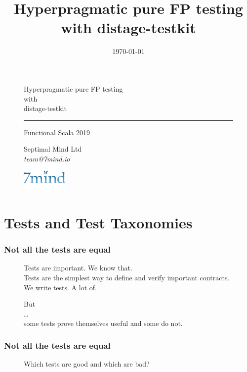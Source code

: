 \documentclass[usenames,dvipsnames]{beamer}
\title{Hyperpragmatic pure FP testing with distage-testkit}
\institute[Septimal Mind Ltd]
    {
    Septimal Mind Ltd\\
    \medskip
    \textit{team@7mind.io}
    }
\date{\today}
\begin{document}
\begin{frame}

\begin{figure}
\color{RubineRed}
\Huge Hyperpragmatic pure FP testing \\
with \\
distage-testkit

\rule{\linewidth}{1mm}

\normalsize Functional Scala 2019
\end{figure}

\begin{figure}
  Septimal Mind Ltd \\
  \textit{team@7mind.io} \\
  \includegraphics[width=0.2\textwidth]{media/logo_7mind.png}
\end{figure}

\end{frame}

\section{Tests and Test Taxonomies}

\begin{frame}
  \frametitle{Not all the tests are equal}

  \begin{figure}
  Tests are important. We know that. \\
  Tests are the simplest way to define and verify important contracts. \\
  \Huge We write tests. A lot of. \\
  \end{figure}

  \begin{figure}
  But \\
  \dots \\
  some tests prove themselves useful and some do not.
  \end{figure}
\end{frame}

\begin{frame}
  \frametitle{Not all the tests are equal}

  \begin{figure}
  \Huge Which tests are good and which are bad?
  \end{figure}
\end{frame}
\end{document}
